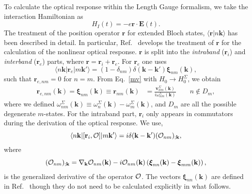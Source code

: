 \documentclass[floatfix,prb,aps,superscriptaddress,showpacs,11pt,preprint,letterpaper]{revtex4}
\begin{document}
To calculate the optical response 
within the Length Gauge formalism, we take the 
interaction Hamiltonian as
\begin{equation}
H_{I}(t)=-e\mathbf{r}\cdot \mathbf{E}(t).
\label{rde}
\end{equation}
The 
treatment of the position operator
$\mathbf{r}$ for extended Bloch states, $\langle\mathbf{r}|n\mathbf{k}\rangle$ has 
been described in detail.\cite{adamsJCP53,blountSSP62} 
In particular, Ref.~ develops
the treatment of $\mathbf{r}$ for
the calculation of the nonlinear optical response.
$\mathbf{r}$ is split into the {\it intraband} 
($\mathbf{r}_i$) and {\it interband} ($\mathbf{r}_e$) parts, where 
$\mathbf{r}=\mathbf{r}_i+\mathbf{r}_e$. 
For $\mathbf{r}_e$ one uses
\begin{equation}
\langle n\mathbf{k} | \mathbf{r}_e | m\mathbf{k}'\rangle =
(1-\delta_{nm})\delta(\mathbf{k}-\mathbf{k}')\boldsymbol{\xi}_{nm}(\mathbf{k})
,
\label{rnminn}
\end{equation}
such that $\mathbf{r}_{e,nm}=0$ for $n=m$.
From Eq.~\eqref{mv} with $H_0\to
H^\Sigma_0$, we obtain
\begin{align}
\mathbf{r}_{e,nm}(\mathbf{k}) =
\boldsymbol{\xi}_{nm}(\mathbf{k})\equiv 
\mathbf{r}_{nm}(\mathbf{k}) 
&=
\frac{\mathbf{v}^\Sigma_{nm}(\mathbf{k})}{i\omega^\Sigma_{nm}(\mathbf{k})}
\quad\quad n\notin D_m 
,
\label{pmnrmn}
\end{align}  
where we defined
$\omega^\Sigma_{nm}(\mathbf{k})\equiv\omega^\Sigma_n(\mathbf{k})-\omega^\Sigma_m(\mathbf{k})$, and
$D_m$ are all the possible degenerate $m$-states. 
For the intraband part, $\mathbf{r}_i$ only appears in
commutators during the derivation of
the optical response. We use,\cite{aversaPRB95}
\begin{equation}
\langle n\mathbf{k} | [\mathbf{r}_i,{\cal O}] | m\mathbf{k}'\rangle
=i\delta(\mathbf{k}-\mathbf{k}')({\cal O}_{nm})_{;\mathbf{k}},
\label{conmri3n}
\end{equation}  
where
\begin{equation}
({\cal O}_{nm})_{;\mathbf{k}}=
\nabla_\mathbf{k} 
{\cal O}_{n m}(\mathbf{k}) 
- 
i 
{\cal O}_{nm}(\mathbf{k}) 
\left(
\boldsymbol{\xi}_{nn}(\mathbf{k}) 
-
\boldsymbol{\xi}_{mm}(\mathbf{k}) 
\right) 
,
\label{gendevnn}
\end{equation} 
is
the generalized derivative 
of the operator ${\cal O}$. 
The vectors $\boldsymbol{\xi}_{nn}(\mathbf{k})$ are defined in 
Ref.~ though they do not need to be 
calculated explicitly in what follows. 
\end{document}
